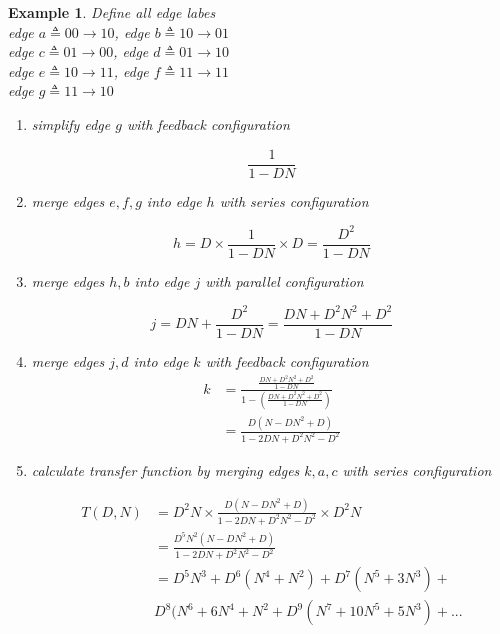 \documentclass[conference]{IEEEtran}
\newtheorem{example}[theorem]{Example}
\begin{document}
\begin{example} Define all edge labes\\
\label{ex3}
 edge $ a\triangleq 0 0 \rightarrow 1 0$,  edge $b \triangleq 1 0 \rightarrow 0 1$\\
 edge $ c \triangleq 0 1 \rightarrow 0 0$, edge $d \triangleq 0 1 \rightarrow 1 0$\\
 edge $ e \triangleq 1 0 \rightarrow 1 1$, edge $f \triangleq 1 1 \rightarrow 1 1$\\
 edge $ g \triangleq 1 1 \rightarrow 1 0$

\begin{enumerate}
\item simplify edge $g$ with feedback configuration

$$ \frac{1}{1-DN}$$

\item merge edges $e,f,g$ into edge $h$ with series configuration

$$h = D\times \frac{1}{1-DN}\times D=\frac{D^2}{1-DN}$$

\item merge edges $h,b$ into edge $j$ with parallel configuration

$$j = DN+ \frac{D^2}{1-DN}= \frac{DN+D^2N^2+D^2}{1-DN}$$

\item merge  edges $j,d$ into edge $k$ with feedback configuration
\begin{equation*}
\begin{split}
 k&= \frac{\frac{DN+D^2N^2+D^2}{1-DN}}{1-(\frac{DN+D^2N^2+D^2}{1-DN})}\\
 &=\frac{D(N-DN^2+D)}{1-2DN+D^2N^2-D^2}
\end{split}
\end{equation*}

\item calculate transfer function by merging edges $k,a,c$ with series configuration

\begin{equation*}
\begin{split}
T(D,N)&=D^2N \times \frac{D(N-DN^2+D)}{1-2DN+D^2N^2-D^2}\times D^2N \\
&=\frac{D^5N^2(N-DN^2+D)}{1-2DN+D^2N^2-D^2}\\
&=D^5N^3+D^6(N^4+N^2)+D^7(N^5+3N^3)+\\
&D^8(N^6+6N^4+N^2+D^9(N^7+10N^5+5N^3)+...
\end{split}
\end{equation*}
\end{enumerate}
\end{example}
\end{document}
